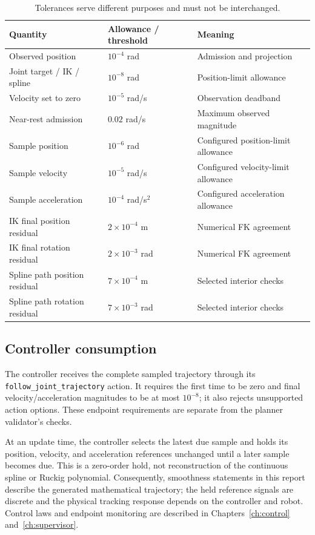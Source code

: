 \documentclass[11pt,a4paper]{report}
\newcommand{\file}[1]{\nolinkurl{#1}}
\begin{document}
\begin{table}[htbp]
\centering\small
\begin{tabular}{@{}lll@{}}
\toprule
Quantity & Allowance / threshold & Meaning \\
\midrule
Observed position & $10^{-4}$ rad & Admission and projection\\
Joint target / IK / spline & $10^{-8}$ rad & Position-limit allowance\\
Velocity set to zero & $10^{-5}$ rad/s & Observation deadband\\
Near-rest admission & $0.02$ rad/s & Maximum observed magnitude\\
Sample position & $10^{-6}$ rad & Configured position-limit allowance\\
Sample velocity & $10^{-5}$ rad/s & Configured velocity-limit allowance\\
Sample acceleration & $10^{-4}$ rad/s$^2$ & Configured acceleration allowance\\
IK final position residual & $2\times10^{-4}$ m & Numerical FK agreement\\
IK final rotation residual & $2\times10^{-3}$ rad & Numerical FK agreement\\
Spline path position residual & $7\times10^{-4}$ m & Selected interior checks\\
Spline path rotation residual & $7\times10^{-3}$ rad & Selected interior checks\\
\bottomrule
\end{tabular}
\caption{Tolerances serve different purposes and must not be interchanged.}
\label{tab:tolerances}
\end{table}

\subsection{Controller consumption}
The controller receives the complete sampled trajectory through its
\file{follow_joint_trajectory} action. It requires the first time to be zero
and final velocity/acceleration magnitudes to be at most $10^{-8}$; it also
rejects unsupported action options. These endpoint requirements are separate
from the planner validator's checks.

At an update time, the controller selects the latest due sample and holds
its position, velocity, and acceleration references unchanged until a later
sample becomes due. This is a zero-order hold, not reconstruction of the
continuous spline or Ruckig polynomial. Consequently, smoothness statements
in this report describe the generated mathematical trajectory; the held
reference signals are discrete and the physical tracking response depends
on the controller and robot. Control laws and endpoint monitoring are described in Chapters~\ref{ch:control} and~\ref{ch:supervisor}.
\end{document}
